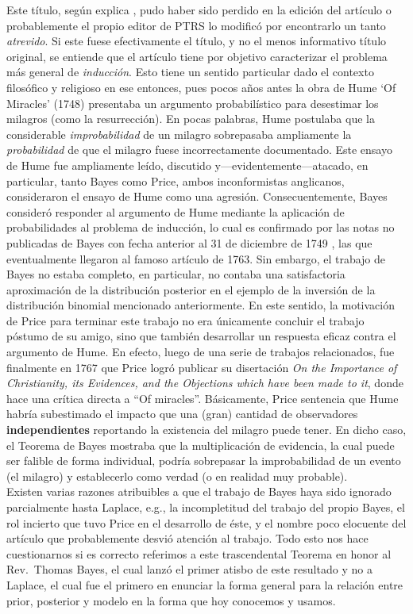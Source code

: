Este título, según explica \cite{stigler2013}, pudo haber sido perdido en la edición del artículo o probablemente el propio editor de PTRS lo modificó por encontrarlo un tanto \emph{atrevido}.  Si este fuese efectivamente el título, y no el menos informativo título original, se entiende que el artículo tiene por objetivo caracterizar  el problema más general de \emph{inducción}. Esto tiene un sentido particular dado el contexto filosófico y religioso en ese entonces, pues pocos años antes la obra de Hume `Of Miracles' (1748) presentaba un argumento probabilístico para desestimar los milagros (como la resurrección). En  pocas  palabras, Hume postulaba que la considerable \emph{improbabilidad} de un milagro sobrepasaba ampliamente la \emph{probabilidad}  de  que el milagro fuese incorrectamente  documentado. Este ensayo de Hume fue ampliamente leído, discutido y---evidentemente---atacado, en particular, tanto Bayes como Price, ambos inconformistas anglicanos, consideraron  el ensayo de Hume como una agresión. Consecuentemente, Bayes consideró responder al argumento de  Hume mediante la aplicación de probabilidades al problema de inducción, lo cual es confirmado por las notas no publicadas de Bayes con fecha anterior al 31 de diciembre de 1749 \cite{bellhouse_2004}, las que eventualmente llegaron al famoso artículo de 1763. Sin embargo, el trabajo de Bayes no estaba completo, en particular, no contaba una satisfactoria aproximación de la distribución posterior en el ejemplo de la inversión de la distribución binomial mencionado anteriormente. En este sentido, la motivación de Price para terminar este trabajo no era únicamente concluir el trabajo póstumo de su amigo, sino que también desarrollar un respuesta eficaz contra el argumento de Hume. En efecto, luego de una serie de  trabajos relacionados, fue  finalmente en 1767 que Price logró publicar su disertación \emph{On the Importance of Christianity, its Evidences, and the Objections which have been made to it}, donde hace una crítica directa a “Of miracles”. Básicamente, Price sentencia que Hume habría subestimado el impacto que una (gran) cantidad de observadores \textbf{independientes} reportando la existencia del milagro puede tener. En dicho caso, el Teorema de Bayes mostraba que la multiplicación de evidencia, la cual puede ser falible de forma individual, podría sobrepasar la improbabilidad de un evento (el milagro) y establecerlo como verdad (o en realidad muy probable). \\

Existen varias razones atribuibles a que el trabajo de Bayes haya sido ignorado parcialmente hasta Laplace, e.g., la incompletitud del trabajo del propio Bayes, el rol incierto que tuvo Price en el desarrollo de éste, y el nombre poco elocuente del artículo que probablemente desvió atención al trabajo. Todo esto nos hace cuestionarnos si es correcto referimos a este trascendental Teorema en honor al Rev.~Thomas Bayes, el cual lanzó el primer atisbo de este resultado y no a Laplace, el cual fue el primero en enunciar la forma general para la relación entre prior, posterior y modelo en la forma que hoy conocemos y usamos. 

